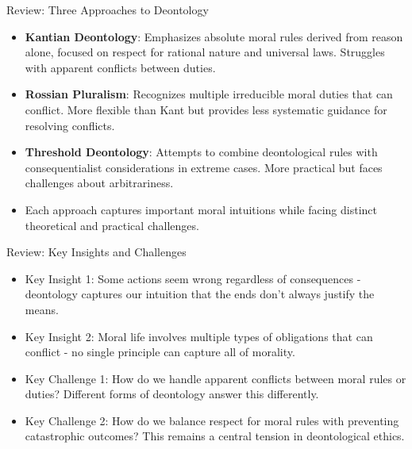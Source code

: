 \documentclass{beamer}
\begin{document}
\begin{frame}{Review: Three Approaches to Deontology}
\begin{itemize}
    \item \textbf{Kantian Deontology}: Emphasizes absolute moral rules derived from reason alone, focused on respect for rational nature and universal laws. Struggles with apparent conflicts between duties.
    
    \item \textbf{Rossian Pluralism}: Recognizes multiple irreducible moral duties that can conflict. More flexible than Kant but provides less systematic guidance for resolving conflicts.
    
    \item \textbf{Threshold Deontology}: Attempts to combine deontological rules with consequentialist considerations in extreme cases. More practical but faces challenges about arbitrariness.
    
    \item Each approach captures important moral intuitions while facing distinct theoretical and practical challenges.
\end{itemize}
\end{frame}

\begin{frame}{Review: Key Insights and Challenges}
\begin{itemize}
    \item Key Insight 1: Some actions seem wrong regardless of consequences - deontology captures our intuition that the ends don't always justify the means.
    
    \item Key Insight 2: Moral life involves multiple types of obligations that can conflict - no single principle can capture all of morality.
    
    \item Key Challenge 1: How do we handle apparent conflicts between moral rules or duties? Different forms of deontology answer this differently.
    
    \item Key Challenge 2: How do we balance respect for moral rules with preventing catastrophic outcomes? This remains a central tension in deontological ethics.
\end{itemize}
\end{frame}
\end{document}
